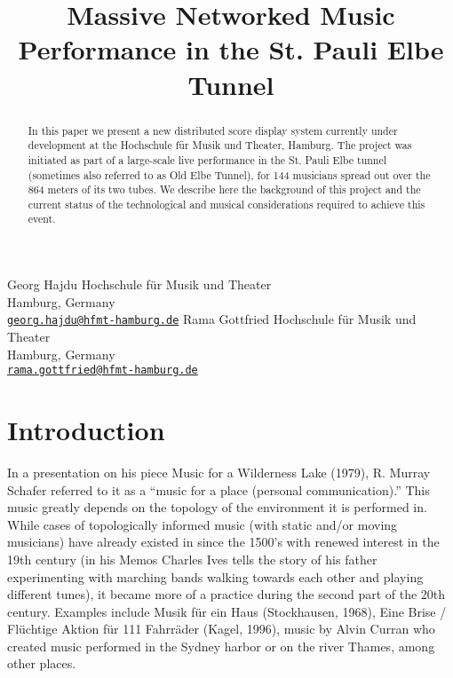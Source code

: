 

\def\papertitle{Massive Networked Music Performance in the St. Pauli Elbe Tunnel
}
\def\firstauthor{Georg Hajdu}
\def\secondauthor{Rama Gottfried}

\def\Hochschule{ Hochschule f\"ur Musik und Theater}

\title{\papertitle}
\twoauthors
   {\firstauthor} {	
      Hochschule f\"ur Musik und Theater\\
         Hamburg, Germany \\ %
   \small{\tt \href{mailto:georg.hajdu@hfmt-hamburg.de}{georg.hajdu@hfmt-hamburg.de}}}
    {\secondauthor} {
   Hochschule f\"ur Musik und Theater\\
   Hamburg, Germany \\ %
   \small{\tt \href{mailto:rama.gottfried@hfmt-hamburg.de}{rama.gottfried@hfmt-hamburg.de}}}





%

\capstartfalse
\maketitle
\capstarttrue
%
\begin{abstract}
In this paper we present a new distributed score display system currently under development at the Hochschule f\"ur Musik und Theater, Hamburg.
The project was initiated as part of a large-scale live performance in the St. Pauli Elbe tunnel (sometimes also referred to as Old Elbe Tunnel), for 144 musicians spread out over the 864 meters of its two tubes.
We describe here the background of this project and the current status of the technological and musical considerations required to achieve this event.

\end{abstract}

\section{Introduction}\label{sec:intro}

%
%
%

In a presentation on his piece Music for a Wilderness Lake (1979), R. Murray Schafer referred to it as a ``music for a place (personal communication).'' 
This music greatly depends on the topology of the environment it is performed in. While cases of topologically informed music (with static and/or moving musicians) have already existed in since the 1500’s with renewed interest in the 19th century (in his Memos Charles Ives tells the story of his father experimenting with marching bands walking towards each other and playing different tunes), it became more of a practice during the second part of the 20th century. Examples include Musik f\"ur ein Haus (Stockhausen, 1968), Eine Brise / Fl\"uchtige Aktion f\"ur 111 Fahrr\"ader (Kagel, 1996), music by Alvin Curran who created music performed in the Sydney harbor or on the river Thames, among other places.

